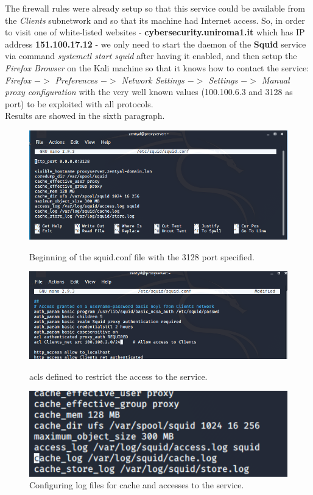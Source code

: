 The firewall rules were already setup so that this service could be available from the \textit{Clients} subnetwork and so that its machine had Internet access. So, in order to visit one of white-listed websites - \textbf{cybersecurity.uniroma1.it} which has IP address \textbf{151.100.17.12} - we only need to start the daemon of the \textbf{Squid} service via command \textit{systemctl start squid} after having it enabled, and then setup the \textit{Firefox Browser} on the Kali machine so that it knows how to contact the service: \textit{Firefox $->$ Preferences $->$ Network Settings $->$ Settings $->$ Manual proxy configuration} with the very well known values (100.100.6.3 and 3128 as port) to be exploited with all protocols.\\
Results are showed in the sixth paragraph.\\

\begin{figure}[!htb]
\centering
\begin{minipage}{.33\textwidth}
  \centering
  \includegraphics[width=1\textwidth]{squidConf1.png}
  \caption[a]{Beginning of the squid.conf file with the 3128 port specified.}\label{fig:4}
\end{minipage}%
\begin{minipage}{.33\textwidth}
  \centering
  \includegraphics[width=1\textwidth]{squidConf2.png}
  \caption[a]{acls defined to restrict the access to the service.}\label{fig:5}
\end{minipage}
\begin{minipage}{.33\textwidth}
  \centering
  \includegraphics[width=1\textwidth]{squidConf3.png}
  \caption[a]{Configuring log files for cache and accesses to the service.}\label{fig:6}
\end{minipage}
\end{figure}
